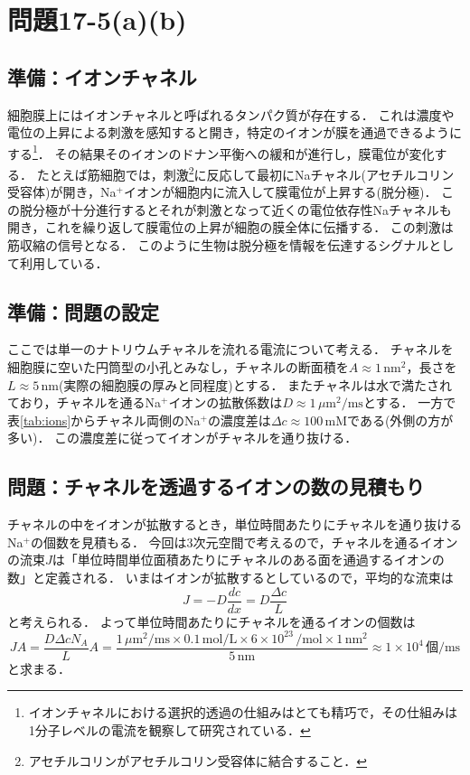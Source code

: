 \documentclass[a4paper,11pt]{jsarticle}
\begin{document}
\section{問題17-5(a)(b)}
\subsection{準備：イオンチャネル}
細胞膜上にはイオンチャネルと呼ばれるタンパク質が存在する．
これは濃度や電位の上昇による刺激を感知すると開き，特定のイオンが膜を通過できるようにする\footnote{イオンチャネルにおける選択的透過の仕組みはとても精巧で，その仕組みは1分子レベルの電流を観察して研究されている\cite{select}．}．
その結果そのイオンのドナン平衡への緩和が進行し，膜電位が変化する．
たとえば筋細胞では，刺激\footnote{アセチルコリンがアセチルコリン受容体に結合すること．}に反応して最初にNaチャネル(アセチルコリン受容体)が開き，Na$^+$イオンが細胞内に流入して膜電位が上昇する(脱分極)．
この脱分極が十分進行するとそれが刺激となって近くの電位依存性Naチャネルも開き，これを繰り返して膜電位の上昇が細胞の膜全体に伝播する．
この刺激は筋収縮の信号となる．
このように生物は脱分極を情報を伝達するシグナルとして利用している．

\subsection{準備：問題の設定}
ここでは単一のナトリウムチャネルを流れる電流について考える．
チャネルを細胞膜に空いた円筒型の小孔とみなし，チャネルの断面積を$A\approx1\,\mathrm{nm}^2$，長さを$L\approx5$\,nm(実際の細胞膜の厚みと同程度)とする．
またチャネルは水で満たされており，チャネルを通るNa$^+$イオンの拡散係数は$D\approx 1\,\mu\mathrm{m}^2/\mathrm{ms}$とする．
一方で表\ref{tab:ions}からチャネル両側のNa$^{+}$の濃度差は$\Delta c\approx 100$\,mMである(外側の方が多い)．
この濃度差に従ってイオンがチャネルを通り抜ける．

\subsection{問題：チャネルを透過するイオンの数の見積もり}
チャネルの中をイオンが拡散するとき，単位時間あたりにチャネルを通り抜けるNa$^+$の個数を見積もる．
今回は3次元空間で考えるので，チャネルを通るイオンの流束$J$は「単位時間単位面積あたりにチャネルのある面を通過するイオンの数」と定義される．
いまはイオンが拡散するとしているので，平均的な流束は
\begin{equation}
  J = - D\frac{dc}{dx} = D\frac{\Delta c}{L}
\end{equation}
と考えられる．
よって単位時間あたりにチャネルを通るイオンの個数は
\begin{equation}
  JA = \frac{D\Delta cN_A}{L}A = \frac{1\,\mu\mathrm{m}^2/\mathrm{ms}\times 0.1\,\mathrm{mol/L}\times 6\times 10^{23}\,\mathrm{/mol}\times 1\,\mathrm{nm}^2}{5 \,\mathrm{nm}} \approx 1\times 10^4\,\mathrm{個/ms}
\end{equation}
と求まる．
\end{document}
